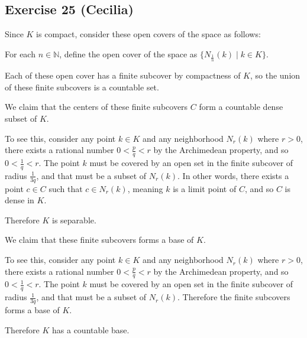 \subsection*{Exercise 25 (Cecilia)}
Since $ K $ is compact, consider these open covers of the space as follows:

For each $ n \in \mathbb{N} $, define the open cover of the space as $ \{ N_{\frac{1}{n}}(k) \mid k \in K \} $.

Each of these open cover has a finite subcover by compactness of $ K $, so the union of these finite subcovers is a countable set.

We claim that the centers of these finite subcovers $ C $ form a countable dense subset of $ K $.

To see this, consider any point $ k \in K $ and any neighborhood $ N_r(k) $ where $ r > 0 $, there exists a rational number $ 0 < \frac{p}{q} < r $ by the Archimedean property, and so $ 0 < \frac{1}{q} < r $. The point $ k $ must be covered by an open set in the finite subcover of radius $ \frac{1}{3q} $, and that must be a subset of $ N_r(k) $. In other words, there exists a point $ c \in C $ such that $ c \in N_r(k) $, meaning $ k $ is a limit point of $ C $, and so $ C $ is dense in $ K $.

Therefore $ K $ is separable.

We claim that these finite subcovers forms a base of $ K $.

To see this, consider any point $ k \in K $ and any neighborhood $ N_r(k) $ where $ r > 0 $, there exists a rational number $ 0 < \frac{p}{q} < r $ by the Archimedean property, and so $ 0 < \frac{1}{q} < r $. The point $ k $ must be covered by an open set in the finite subcover of radius $ \frac{1}{3q} $, and that must be a subset of $ N_r(k)$. Therefore the finite subcovers forms a base of $ K $.

Therefore $ K $ has a countable base.